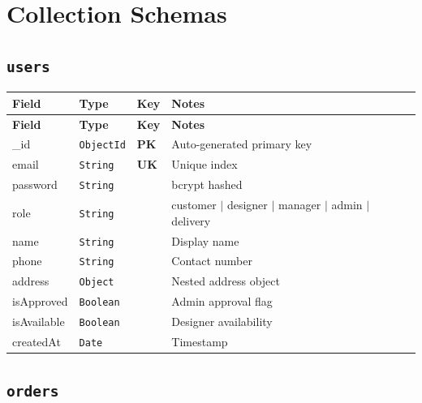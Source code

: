 \documentclass[a4paper,11pt]{article}
\newcommand{\pk}{\textcolor{success}{\textbf{PK}}}
\newcommand{\uk}{\textcolor{info}{\textbf{UK}}}
\newcommand{\coll}[1]{\textcolor{primary}{\texttt{\textbf{#1}}}}
\newcommand{\dtype}[1]{\textcolor{secondary}{\texttt{#1}}}
\begin{document}
\section{Collection Schemas}

\subsection{\coll{users}}

\begin{longtable}{@{}L{3.2cm}L{2.8cm}C{1.5cm}L{5.5cm}@{}}
\toprule
{}
\textbf{Field} & \textbf{Type} & \textbf{Key} & \textbf{Notes} \\
\midrule
\endfirsthead
\toprule
{}
\textbf{Field} & \textbf{Type} & \textbf{Key} & \textbf{Notes} \\
\midrule
\endhead
\bottomrule
\endlastfoot
\_id        & \dtype{ObjectId} & \pk  & Auto-generated primary key \\
email       & \dtype{String}   & \uk  & Unique index \\
password    & \dtype{String}   &      & bcrypt hashed \\
role        & \dtype{String}   &      & customer $|$ designer $|$ manager $|$ admin $|$ delivery \\
name        & \dtype{String}   &      & Display name \\
phone       & \dtype{String}   &      & Contact number \\
address     & \dtype{Object}   &      & Nested address object \\
isApproved  & \dtype{Boolean}  &      & Admin approval flag \\
isAvailable & \dtype{Boolean}  &      & Designer availability \\
createdAt   & \dtype{Date}     &      & Timestamp \\
\end{longtable}

\subsection{\coll{orders}}
\end{document}
